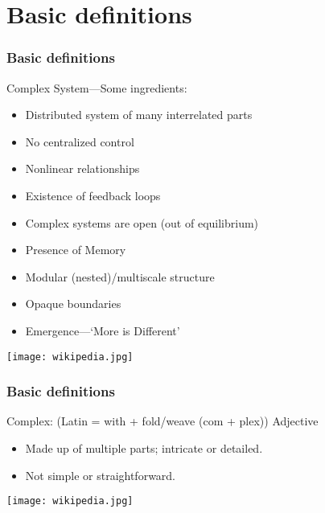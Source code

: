 
\section{Basic definitions}

\begin{frame}
  \frametitle{Basic definitions}

  \begin{block}{Complex System---Some ingredients:}
    \begin{itemize}
    \item<2->
      Distributed system of many interrelated parts
    \item<3->
      No centralized control 
    \item<4->
      Nonlinear relationships
    \item<5->
      Existence of feedback loops
    \item<6->
      Complex systems are open (out of equilibrium)
    \item<7->
      Presence of Memory
    \item<8->
      Modular (nested)/multiscale structure
    \item<9->
      Opaque boundaries
    \item<10->
      Emergence---`More is Different'\cite{anderson1972a}
    \end{itemize}
  \end{block}
  \mbox{}
  \hfill
  \texttt{[image: wikipedia.jpg]}

\end{frame}

\begin{frame}
  \frametitle{Basic definitions}


  \begin{block}{{Complex:} (Latin = with + fold/weave (com + plex))}
    \alert{Adjective}
    \begin{itemize}
    \item Made up of multiple parts; intricate or detailed.
    \item Not simple or straightforward.
    \end{itemize}
  \end{block}
\mbox{} \hfill \texttt{[image: wikipedia.jpg]}

\end{frame}


